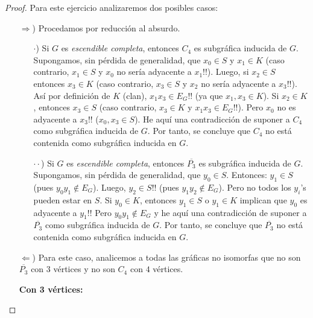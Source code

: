 \documentclass{article}
\begin{document}
\begin{enumerate}
\begin{proof}
      Para este ejercicio analizaremos dos posibles casos:
      \begin{itemize}
        \item[$\Rightarrow$)] Procedamos por reducción al absurdo.
          \begin{itemize}
            \item[$\cdot$)] Si $G$ es \textit{escendible completa}, entonces $C_4$ es
              subgr\'afica inducida de $G$.
              Supongamos, sin p\'erdida de generalidad, que $x_0 \in S$ y $x_1 \in K$
              (caso contrario, $x_1 \in S$ y $x_0$ no ser\'ia adyacente a $x_1$!!).
              Luego, si $x_2 \in S$ entonces $x_3 \in K$ (caso contrario, $x_3 \in S$
              y $x_2$ no ser\'ia adyacente a $x_3$!!). 
              As\'i por definici\'on de $K$ (clan), $x_1 x_3 \in E_G$!!
              (ya que $x_1, x_3 \in K$). 
              Si $x_2 \in K$, entonces $x_3 \in S$ (caso contrario, $x_3 \in K$ y
              $x_1 x_3 \in E_G$!!). Pero $x_0$ no es adyacente a $x_3$!! ($x_0, x_3
              \in S$). He aqu\'i una contradicci\'on de suponer a $C_4$ como subgr\'afica
              inducida de $G$.
              Por tanto, se concluye que $C_4$ no est\'a contenida como subgr\'afica
              inducida en $G$. 

            \item[$\cdot\cdot$)] Si $G$ es \textit{escendible completa}, entonces
              $\overline{P_3}$ es subgr\'afica inducida de $G$. 
              Supongamos, sin pérdida de generalidad, que $y_0 \in S$. 
              Entonces: $y_1 \in S$ (pues $y_0 y_1 \notin E_G$).
              Luego, $y_2 \in S$!! (pues $y_1 y_2 \notin E_G$). Pero no todos los $y_i$'s
              pueden estar en $S$. 
              Si $y_0 \in K$, entonces $y_1 \in S$ o $y_1 \in K$ implican que $y_0$ es
              adyacente a $y_1$!! 
              Pero $y_0 y_1 \notin E_G$ y he aqu\'i una contradicci\'on de suponer a
              $\overline{P_3}$
              como subgr\'afica inducida de $G$.
              Por tanto, se concluye que $\overline{P_3}$ no est\'a contenida como
              subgr\'afica inducida en $G$.
          \end{itemize}

        \item[$\Leftarrow$)] Para este caso, analicemos a todas las gr\'aficas no isomorfas
          que no son $\overline{P_3}$ con $3$ v\'ertices y no son $C_4$ con $4$ v\'ertices.

          \textbf{Con 3 v\'ertices:}


\end{itemize}
\end{proof}
\end{enumerate}
\end{document}
